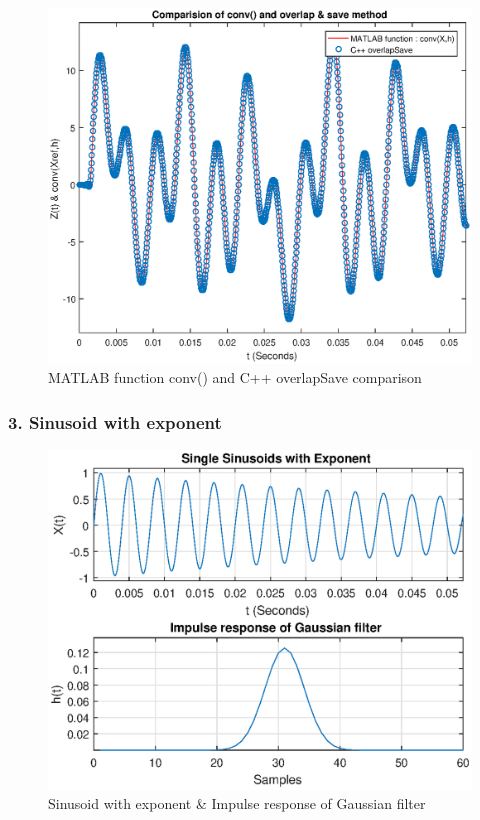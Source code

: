 \begin{figure}[h]
	\centering
	\includegraphics[width=13cm]{./algorithms/overlap_save/figures/mixed_signal2_conv_and_C++.eps}
	\caption{MATLAB function conv() and C++ overlapSave comparison}\label{mixed_signal2_conv_and_C++}
\end{figure}

\newpage

\subsubsection{3. Sinusoid with exponent}
\begin{figure}[h]
	\centering
	\includegraphics[width=12cm]{./algorithms/overlap_save/figures/sinusoid_with_exponent.eps}
	\caption{Sinusoid with exponent \& Impulse response of Gaussian filter}\label{sinusoid_with_exponent}
\end{figure}

